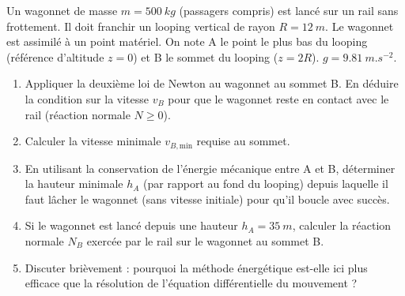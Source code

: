 \documentclass[11pt]{article}
\begin{document}
\begin{exercice}
Un wagonnet de masse $m = \SI{500}{kg}$ (passagers compris) est lancé sur un rail sans frottement. Il doit franchir un looping vertical de rayon $R = \SI{12}{m}$. Le wagonnet est assimilé à un point matériel. On note A le point le plus bas du looping (référence d'altitude $z=0$) et B le sommet du looping ($z=2R$). $g = \SI{9,81}{m.s^{-2}}$.
\begin{enumerate}
    \item Appliquer la deuxième loi de Newton au wagonnet au sommet B. En déduire la condition sur la vitesse $v_B$ pour que le wagonnet reste en contact avec le rail (réaction normale $N \ge 0$).
    \item Calculer la vitesse minimale $v_{B,\text{min}}$ requise au sommet.
    \item En utilisant la conservation de l'énergie mécanique entre A et B, déterminer la hauteur minimale $h_A$ (par rapport au fond du looping) depuis laquelle il faut lâcher le wagonnet (sans vitesse initiale) pour qu'il boucle avec succès.
    \item Si le wagonnet est lancé depuis une hauteur $h_A = \SI{35}{m}$, calculer la réaction normale $N_B$ exercée par le rail sur le wagonnet au sommet B.
    \item Discuter brièvement : pourquoi la méthode énergétique est-elle ici plus efficace que la résolution de l'équation différentielle du mouvement ?
\end{enumerate}
\end{exercice}
\end{document}
